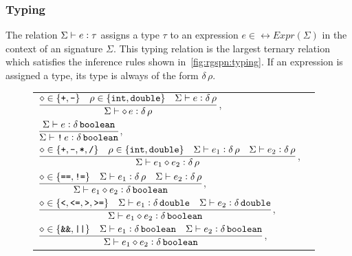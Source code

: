 \subsubsection{Typing}

The relation \(\Sigma \vdash e \mathrel{\vcentcolon} \tau\) assigns a type \(\tau\) to an expression \(e \in \rel{Expr}(\Sigma)\) in the context of an  signature \(\Sigma\). This typing relation is the largest ternary relation which satisfies the inference rules shown in~\cref{fig:rgspn:typing}. If an expression is assigned a type, its type is always of the form \(\delta\,\rho\).

\begin{figure}
  \begin{tabu}{@{}X[c]r@{}}
    \(\dfrac{{\diamond} \in \{\texttt{\upshape +}, \texttt{\upshape -}\}
      \quad \rho \in \{\texttt{\upshape int}, \texttt{\upshape double}\}
      \quad \Sigma \vdash e \mathrel{\vcentcolon} \delta\,\rho
    }{\Sigma \vdash \mathop{\diamond} e \mathrel{\vcentcolon} \delta\,\rho}\),
    &  \\[1ex]
    \(\dfrac{\Sigma \vdash e \mathrel{\vcentcolon} \delta\,\texttt{\upshape boolean}
    }{\Sigma \vdash \mathop{\texttt{\upshape !}} e \mathrel{\vcentcolon} \delta\,\texttt{\upshape boolean}}\),
    &  \\[1ex]
    \(\dfrac{{\diamond} \in \{\texttt{\upshape +}, \texttt{\upshape -}, \texttt{\upshape *}, \texttt{\upshape /}\}
      \quad \rho \in \{\texttt{\upshape int}, \texttt{\upshape double}\}
      \quad \Sigma \vdash e_1 \mathrel{\vcentcolon} \delta\,\rho
      \quad \Sigma \vdash e_2 \mathrel{\vcentcolon} \delta\,\rho
    }{\Sigma \vdash e_1 \mathbin{\diamond} e_2 \mathrel{\vcentcolon} \delta \,\rho}\),
    &  \\[1ex]
    \(\dfrac{{\diamond} \in \{\texttt{\upshape ==}, \texttt{\upshape !=}\}
      \quad \Sigma \vdash e_1 \mathrel{\vcentcolon} \delta\,\rho
      \quad \Sigma \vdash e_2 \mathrel{\vcentcolon} \delta\,\rho
    }{\Sigma \vdash e_1 \mathbin{\diamond} e_2 \mathrel{\vcentcolon} \delta\,\texttt{\upshape boolean}}\),
    &  \\[1ex]
    \(\dfrac{{\diamond} \in \{\texttt{\upshape <}, \texttt{\upshape <=}, \texttt{\upshape >}, \texttt{\upshape >=}\}
      \quad \Sigma \vdash e_1 \mathrel{\vcentcolon} \delta\,\texttt{\upshape double}
      \quad \Sigma \vdash e_2 \mathrel{\vcentcolon} \delta\,\texttt{\upshape double}
    }{\Sigma \vdash e_1 \mathbin{\diamond} e_2 \mathrel{\vcentcolon} \delta\,\texttt{\upshape boolean}}\),
    &  \\[1ex]
    \(\dfrac{{\diamond} \in \{\texttt{\upshape \&\&}, \texttt{\upshape ||}\}
      \quad \Sigma \vdash e_1 \mathrel{\vcentcolon} \delta\,\texttt{\upshape boolean}
      \quad \Sigma \vdash e_2 \mathrel{\vcentcolon} \delta\,\texttt{\upshape boolean}
    }{\Sigma \vdash e_1 \mathbin{\diamond} e_2 \mathrel{\vcentcolon} \delta\,\texttt{\upshape boolean}}\),
    &  \\[1ex]

\end{tabu}
\end{figure}
